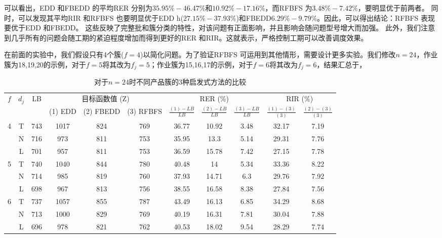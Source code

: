 可以看出，EDD 和FBEDD 的平均RER 分别为$35.95\% - 46.47\%$和$10.92\% - 17.16\%$，而RFBFS 为$3.48\% - 7.42\%$，要明显优于前两者。
同时，可以发现其平均RIR 和RFBFS 也要明显优于EDD h($27.15\% - 37.93\%$)和FBEDD$6.29\% - 9.79\%$。因此，可以得出结论：RFBFS 表现要优于EDD
 和FBEDD。
这些反映了完整批和簇分类的特性，对该问题有正面影响，并且影响会随问题型号增大而加强。
此外，我们注意到几乎所有的问题会随工期的紧迫程度增加而得到更好的RER 和RIR。这就表示，严格控制工期可以改善调度效果。

在前面的实验中，我们假设只有4个簇($f=4$)以简化问题。为了验证RFBFS 可运用到其他情形，需要设计更多实验。我们修改$n=24$，作业簇为18,19,20的示例，对于$f = 5$将其改为$f_j=5$；作业簇为15,16,17的示例，对于$f = 6$将其改为$f_j=6$，结果汇总于，
\begin{table}[h]
  \centering\xiaowu
  \caption{对于$n=24$时不同产品簇的3种启发式方法的比较}
    \begin{tabular}{ccccccccccc}
    \toprule
    \multirow{2}[4]{*}{$f$} & \multirow{2}[4]{*}{$d_j$} & \multirow{2}[4]{*}{LB} & \multicolumn{3}{c}{目标函数值 (Z)} & \multicolumn{3}{c}{RER (\%)} & \multicolumn{2}{c}{RIR (\%)} \\
    \cline{4-11}
          &       &       & (1) EDD & (2) FBEDD & (3) RFBFS & $\frac{(1) - LB}{LB}$ & $\frac{(2) - LB}{LB}$ & $\frac{(3) - LB}{LB}$ &$\frac{(1) - (3)}{(3)}$ & $\frac{(2) - (3)}{(3)}$\\
          \midrule
    \multirow{3}[1]{*}{4} & T     & 743   & 1017  & 824   & 769   & 36.77 & 10.92 & 3.48  & 32.17 & 7.19 \\
          & N     & 716   & 973   & 811   & 753   & 35.95 & 13.3  & 5.14  & 29.31 & 7.76 \\
          & L     & 701   & 957   & 811   & 753   & 36.59 & 15.78 & 7.42  & 27.15 & 7.78 \\[3pt]
    \multirow{3}[0]{*}{5} & T     & 740   & 1040  & 844   & 780   & 40.48 & 14    & 5.34  & 33.36 & 8.22 \\
          & N     & 714   & 985   & 819   & 760   & 37.93 & 14.71 & 6.3   & 29.76 & 7.92 \\
          & L     & 698   & 967   & 813   & 756   & 38.55 & 16.58 & 8.38  & 27.84 & 7.56 \\[3pt]
    \multirow{3}[1]{*}{6} & T     & 737   & 1057  & 855   & 787   & 43.49 & 16.13 & 6.85  & 34.29 & 8.68 \\
          & N     & 713   & 1000  & 829   & 769   & 40.19 & 16.31 & 7.81  & 30.04 & 7.88 \\
          & L     & 696   & 978   & 821   & 762   & 40.53 & 18.02 & 9.54  & 28.29 & 7.74 \\
    \bottomrule
    \end{tabular}
  \label{tab:n=24compare}
\end{table}
